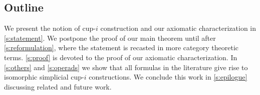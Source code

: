 
\subsection*{Outline}

We present the notion of \mbox{cup-$i$} construction and our axiomatic characterization in \cref{s:statement}.
We postpone the proof of our main theorem until after \cref{s:reformulation}, where the statement is recasted in more category theoretic terms.
\cref{s:proof} is devoted to the proof of our axiomatic characterization.
In \cref{s:others} and \cref{s:operads} we show that all formulas in the literature give rise to isomorphic simplicial \mbox{cup-$i$} constructions.
We conclude this work in \cref{s:epilogue} discussing related and future work.